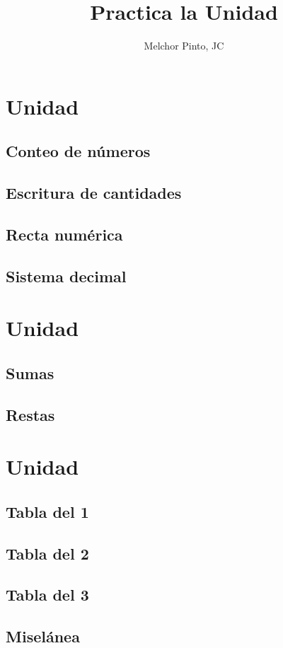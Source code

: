\documentclass[12pt,addpoints]{repaso}
\title{Practica la Unidad}
\author{Melchor Pinto, JC}
\begin{document}
\INFO%
\tableofcontents
\newpage
\begin{questions}\large
	\section{Unidad}

	\subsection{Conteo de números}
	\subsection{Escritura de cantidades}
	\subsection{Recta numérica}
	\subsection{Sistema decimal}

	\section{Unidad}

	\subsection{Sumas}
	\subsection{Restas}

	\section{Unidad}

	\subsection{Tabla del 1}
	\subsection{Tabla del 2}
	\subsection{Tabla del 3}
	\subsection{Miselánea}
	\questionboxed[10]{}
\end{questions}
\end{document}
